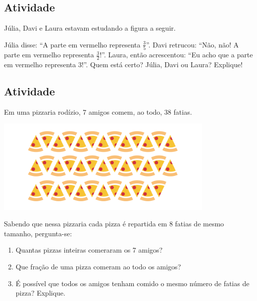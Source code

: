 \subsection{Atividade}

Júlia, Davi e Laura estavam estudando a figura a seguir.
\begin{center}
\end{center}
Júlia disse: ``A parte em vermelho representa $\frac{3}{5}$''. Davi retrucou: ``Não, não! A parte em vermelho representa $\frac{3}{2}$!''. Laura, então acrescentou: ``Eu acho que a parte em vermelho representa $3$!''. Quem está certo? Júlia, Davi ou Laura? Explique!

\subsection{Atividade}

Em uma pizzaria rodízio, 7 amigos comem, ao todo, 38 fatias.

\begin{center}
\includegraphics[width=300pt, keepaspectratio]{..//media/cap2/secoes/pngs_licao_02/ativ18_fig01.png} 
\end{center}


Sabendo que nessa pizzaria cada pizza é repartida em 8 fatias de mesmo tamanho, pergunta-se: 
\begin{enumerate} [\quad a)] %
  \item     Quantas pizzas inteiras comeraram os 7 amigos? 
  \item     Que fração de uma pizza comeram  ao todo os amigos? 
  \item     É possível que todos os amigos tenham comido o mesmo número de fatias de pizza? Explique.
\end{enumerate} %


